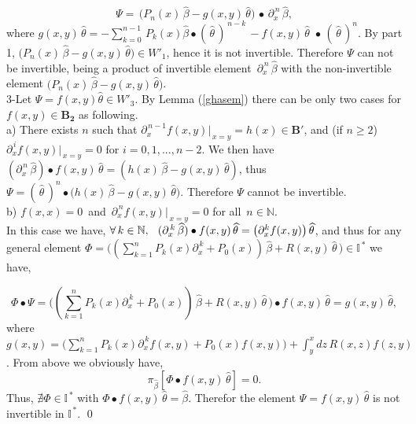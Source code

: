 \documentclass[10pt]{article}
\newcommand{\be}{\begin{equation}}
\newcommand{\ee}{\end{equation}}
\newcommand{\nn}{\nonumber}
\newcommand{\rd}{\partial}
\newcommand{\mIs}{{{\mathbb I}}^{\,*}}
\begin{document}
{{\be\Psi=\,\big( P_{n}(x)\,\widehat{\beta}-g(x,y)\,\widehat{\theta}
\big) \,\bullet
\,{\rd^{\,n}_{x}}\,\widehat{\beta},\label{nima2}\nn\ee where
$g(x,y)\,\widehat{\theta}= -\sum_{k=0}^{n-1}
\,{P_{k}(x)}\widehat{\beta}\bullet(\,\widehat{\theta}\,)^{\,
{n-k}}\,-{f(x,y)}\,\widehat{\theta}\,\,\bullet\,(\,\widehat{\theta}\,)^{n}$.
By part 1, $\big( P_{n}(x)\,\widehat{\beta}-g(x,y)\,\widehat{\theta}
\big)\in {W'}_{1}$, hence it is not invertible. Therefore $\Psi$ can
not be invertible, being a product of invertible element
$\,{\rd^{\,n}_{x}}\,\widehat{\beta}$ with the non-invertible element
$\big( P_{n}(x)\,\widehat{\beta}-g(x,y)\,\widehat{\theta} \big)$.
 \\

3-Let $\Psi=f(x,y)\widehat{\theta}\in {W'}_{3}$. By Lemma
(\ref{ghasem}) there can be only two cases
for $f(x,y)\in \boldsymbol{{B}_2}$ as following.\\

a) There exists $n$ such that
$\rd^{\,n-1}_{x}f(x,y)|_{\,x=y}=h(x)\in \boldsymbol{B'}$, and (if
$n\geq 2$) $\rd^{\,i}_{x}f(x,y)|_{\,x=y}=0$ for $i=0,1,...,n-2$. We
then have $(\rd_{x}^{\,n}\,\widehat{\beta})\bullet
f(x,y)\,\widehat{\theta}=(h(x)\,\widehat{\beta}-g(x,y)\,\widehat{\theta})$,
thus $\Psi=
(\,\widehat{\theta}\,)^{n}\bullet\big(h(x)\,\widehat{\beta}-g(x,y)\,\widehat{\theta}\big).$
Therefore $\Psi$ cannot be
invertible.\\

b) $f(x,x)=0$\, and\, $\rd^{\,n}_{x}f(x,y)|_{\,x=y}=0$ for all $\,n \in \mathbb{N}$.\\

In this case we have, $\forall \,k\in
\mathbb{N},\hspace{0.25cm}(\rd_{x}^{\,k}\,\widehat{\beta})\bullet
f(x,y)\,\widehat{\theta}=\big(\rd^{k}_{x}f(x,y)\big)\,\widehat{\theta}$,
and thus for any general element $\Phi=\big((\sum^{n}_{k=1} P_{k}(x)
\rd_{x}^{\,k}+P_{0}(x))\,\widehat{\beta}+
 R(x,y)\,\widehat{\theta}\,\big)\in \mIs$ we have,

\be\Phi\bullet\Psi=\big((\sum^{n}_{k=1} P_{k}(x)
\rd_{x}^{\,k}+P_{0}(x))\,\widehat{\beta}+
 R(x,y)\,\widehat{\theta}\,\big)\bullet f(x,y)\,\widehat{\theta}=g(x,y)\,\widehat{\theta},\label{nima4}\nn\ee where $g(x,y)=\big(\sum^{n}_{k=1} P_{k}(x) \rd_{x}^{\,k}
f(x,y)+P_{0}(x) f(x,y)\big)+
 \int^{x}_{y} dz\,R(x,z) f(z,y)$. From above we obviously
 have, \be {{\pi}_{\widehat{\beta}}}[\Phi\bullet
f(x,y)\,\widehat{\theta}]=0.\nn\ee Thus, $\nexists \Phi\in\mIs$ with
$\Phi\bullet f(x,y)\,\widehat{\theta}=\widehat{\beta}.$ Therefor the
element $\Psi=f(x,y)\,\widehat{\theta}$ is not
invertible in $\mIs$. \qed\\

}}
\end{document}
